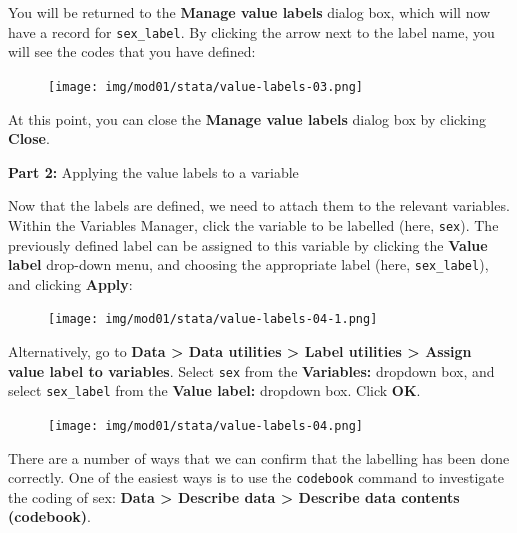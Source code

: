 \documentclass[
  a4paper,
]{memoir}
\begin{document}
You will be returned to the \textbf{Manage value labels} dialog box,
which will now have a record for \texttt{sex\_label}. By clicking the
arrow next to the label name, you will see the codes that you have
defined:

\begin{figure}[H]

{\centering \texttt{[image: img/mod01/stata/value-labels-03.png]}

}

\end{figure}

At this point, you can close the \textbf{Manage value labels} dialog box
by clicking \textbf{Close}.

\textbf{Part 2:} Applying the value labels to a variable

Now that the labels are defined, we need to attach them to the relevant
variables. Within the Variables Manager, click the variable to be
labelled (here, \texttt{sex}). The previously defined label can be
assigned to this variable by clicking the \textbf{Value label} drop-down
menu, and choosing the appropriate label (here, \texttt{sex\_label}),
and clicking \textbf{Apply}:

\begin{figure}[H]

{\centering \texttt{[image: img/mod01/stata/value-labels-04-1.png]}

}

\end{figure}

Alternatively, go to \textbf{Data \textgreater{} Data utilities
\textgreater{} Label utilities \textgreater{} Assign value label to
variables}. Select \texttt{sex} from the \textbf{Variables:} dropdown
box, and select \texttt{sex\_label} from the \textbf{Value label:}
dropdown box. Click \textbf{OK}.

\begin{figure}[H]

{\centering \texttt{[image: img/mod01/stata/value-labels-04.png]}

}

\end{figure}

There are a number of ways that we can confirm that the labelling has
been done correctly. One of the easiest ways is to use the
\texttt{codebook} command to investigate the coding of sex: \textbf{Data
\textgreater{} Describe data \textgreater{} Describe data contents
(codebook)}.
\end{document}
